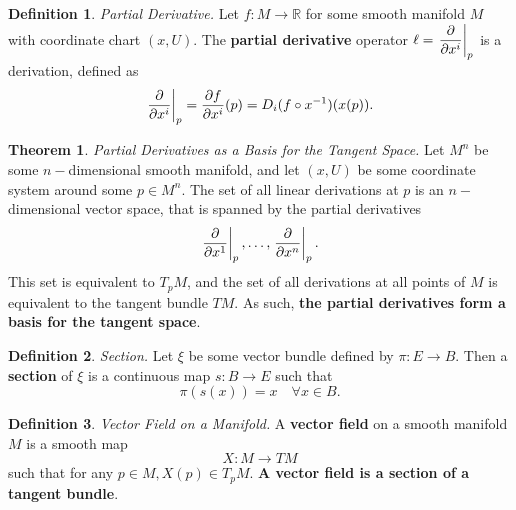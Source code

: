 \documentclass[10pt,landscape]{article}
\theoremstyle{definition}
\newtheorem{definition}{Definition}[section]
\theoremstyle{theorem}
\newtheorem{theorem}{Theorem}[section]
\theoremstyle{summary}
\theoremstyle{remark}
\newcommand{\R}{\mathbb{R}}
\begin{document}
\begin{multicols*}{3}
\theoremstyle{definition}
\begin{definition}{\textit{Partial Derivative.}}
   Let $f:M\rightarrow \R$ for some smooth manifold $M$ with coordinate chart $(x,U)$. The \textbf{partial derivative} operator $\ell = \displaystyle\left.\pdv{}{x^i}\right|_p$ is a derivation, defined as
   \begin{equation}
    \displaystyle\left.\pdv{}{x^i}\right|_p = {\pdv{f}{x^i}} (p) = D_i(f\circ x^{-1})(x(p)).
   \end{equation}
\end{definition}

\theoremstyle{theorem}
\begin{theorem}{\textit{Partial Derivatives as a Basis for the Tangent Space.}}
\label{thm_partialbases}
   Let $M^n$ be some $n-$dimensional smooth manifold, and let $(x,U)$ be some coordinate system around some $p\in M^n$. The set of all linear derivations at $p$ is an $n-$dimensional vector space, that is spanned by
   the partial derivatives
   \begin{equation}
    \displaystyle\left.\pdv{}{x^1}\right|_p,\ldots,\displaystyle\left.\pdv{}{x^n}\right|_p.
   \end{equation}
   This set is equivalent to $T_pM$, and the set of all derivations at all points of $M$ is equivalent to the tangent bundle $TM$. As such, \textbf{the partial derivatives form a basis for the tangent space}.
\end{theorem}

\theoremstyle{definition}
\begin{definition}{\textit{Section.}}
    Let $\xi$ be some vector bundle defined by $\pi:E\rightarrow B$. Then a \textbf{section} of $\xi$ is a continuous map $s:B\rightarrow E$ such that 
    \begin{equation}
        \pi(s(x)) = x \quad \forall x\in B.
    \end{equation}
\end{definition}

\theoremstyle{definition}
\begin{definition}{\textit{Vector Field on a Manifold.}}
\label{def_vectorfield}
    A \textbf{vector field} on a smooth manifold $M$ is a smooth map 
    \begin{equation}
        X:M\rightarrow TM
    \end{equation}
    such that for any $p\in M, X(p) \in T_pM$. \textbf{A vector field is a section of a tangent bundle}.
\end{definition}


\end{multicols*}
\end{document}
